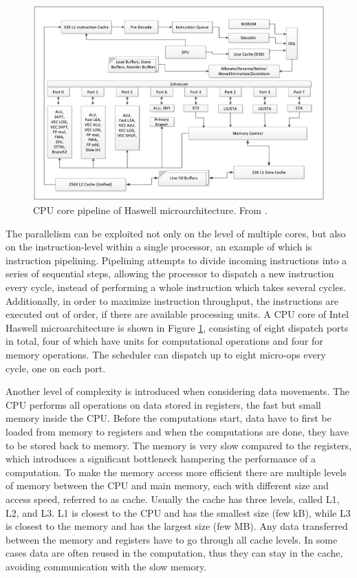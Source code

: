 \begin{figure}[t]
  \centering
  \includegraphics[width=\textwidth]{images/haswell_microarchitecture.png}
  \caption{CPU core pipeline of Haswell microarchitecture. From \cite{intel-orm-2016}.}
  \label{fig:hsw-microarch}
\end{figure}

The parallelism can be exploited not only on the level of multiple cores, but also on the instruction-level within a single processor, an example of which is instruction pipelining. Pipelining attempts to divide incoming instructions into a series of sequential steps, allowing the processor to dispatch a new instruction every cycle, instead of performing a whole instruction which takes several cycles. Additionally, in order to maximize instruction throughput, the instructions are executed out of order, if there are available processing units.
A CPU core of Intel Haswell microarchitecture is shown in Figure \ref{fig:hsw-microarch}, consisting of eight dispatch ports in total, four of which have units for computational operations and four for memory operations. The scheduler can dispatch up to eight micro-ops every cycle, one on each port.

Another level of complexity is introduced when considering data movements. The CPU performs all operations on data stored in registers, the fast but small memory inside the CPU. Before the computations start, data have to first be loaded from memory to registers and when the computations are done, they have to be stored back to memory. The memory is very slow compared to the registers, which introduces a significant bottleneck hampering the performance of a computation. To make the memory access more efficient there are multiple levels of memory between the CPU and main memory, each with different size and access speed, referred to as cache. Usually the cache has three levels, called L1, L2, and L3. L1 is closest to the CPU and has the smallest size (few kB), while L3 is closest to the memory and has the largest size (few MB). Any data transferred between the memory and registers have to go through all cache levels. 
In some cases data are often reused in the computation, thus they can stay in the cache, avoiding communication with the slow memory.

